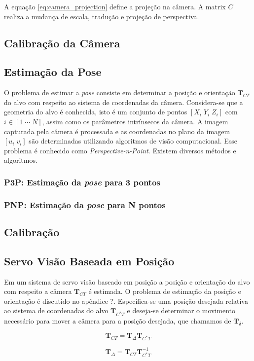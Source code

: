 A equação \eqref{eq:camera_projection} define a projeção na câmera. A matrix $C$ realiza a mudança de escala, tradução e projeção de perspectiva. 

\subsection{Calibração da Câmera}

\subsection{Estimação da Pose}
O problema de estimar a \textit{pose} consiste em determinar a posição e orientação $\bm{T}_{CT}$ do alvo com respeito ao sistema de coordenadas da câmera. Considera-se que a geometria do alvo é conhecida, isto é um conjunto de pontos $[X_i \; Y_i \; Z_i]$ com $i \in [1\; \cdots \; N]$, assim como os parâmetros intrínsecos da câmera. A imagem capturada pela câmera é processada e as coordenadas no plano da imagem $[u_i\; v_i]$ são determinadas utilizando algoritmos de visão computacional. Esse problema é conhecido como \textit{Perspective-n-Point}. Existem diversos métodos e algoritmos. 

\subsubsection{P3P: Estimação da \textit{pose} para 3 pontos}

\subsubsection{PNP: Estimação da \textit{pose} para N pontos}

\subsection{Calibração}

\subsection{Servo Visão Baseada em Posição}
Em um sistema de servo visão baseado em posição a posição e orientação do alvo com respeito a câmera $\bm{T}_{CT}$ é estimada. O problema de estimação da posição e orientação é discutido no apêndice ?.
Especifica-se uma posição desejada relativa ao sistema de coordenadas do alvo  $\bm{T}_{C^*T}$ e deseja-se determinar o movimento necessário para mover a câmera para a posição desejada, que chamamos de $\bm{T}_\delta$.

\begin{equation}
 \bm{T}_{CT} =  \bm{T}_\Delta \bm{T}_{C^*T}
\end{equation}

\begin{equation}
 \bm{T}_\Delta  =   \bm{T}_{CT} \bm{T}_{C^*T}^{-1}
\end{equation}